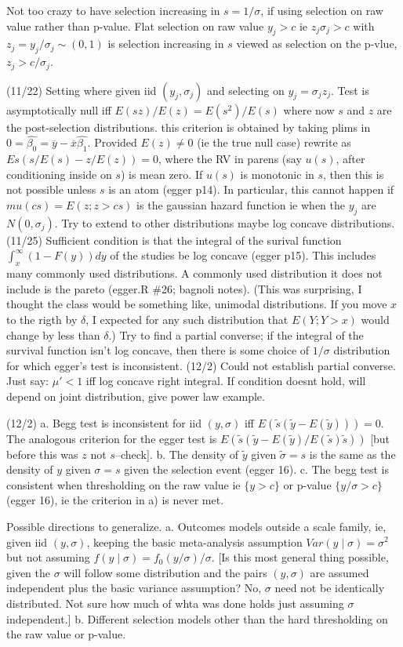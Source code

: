 \documentclass{article}
\renewcommand{\t}[1]{\tilde{#1}}
\begin{document}
Not too crazy to have selection increasing in $s=1/\sigma$, if using
selection on raw value rather than p-value. Flat selection on raw
value $y_j>c$ ie $z_j\sigma_j>c$ with $z_j=y_j/\sigma_j\sim (0,1)$ is
selection increasing in $s$ viewed as selection on the p-vlue,
$z_j>c/\sigma_j$.

(11/22) Setting where given iid $(y_j,\sigma_j)$ and selecting on
$y_j=\sigma_jz_j$. Test is asymptotically null iff
$E(sz)/E(z)=E(s^2)/E(s)$ where now $s$ and $z$ are the post-selection
distributions. this criterion is obtained by taking plims in
$0=\hat{\beta_0}=\overline{y}-\overline{x}\hat{\beta_1}$. Provided
$E(z)\neq 0$ (ie the true null case) rewrite as $Es(s/E(s)-z/E(z))=0$,
where the RV in parens (say $u(s)$, after conditioning inside on $s$)
is mean zero. If $u(s)$ is monotonic in $s$, then this is not possible
unless $s$ is an atom (egger p14). In particular, this cannot happen
if $mu(cs)=E(z;z>cs)$ is the gaussian hazard function ie when the
$y_j$ are $N(0,\sigma_j)$. Try to extend to other distributions maybe
log concave distributions. (11/25) Sufficient condition is that the
integral of the surival function $\int_x^{\infty}(1-F(y))dy$ of the
studies be log concave (egger p15). This includes many commonly used
distributions. A commonly used distribution it does not include is the
pareto (egger.R \#26; bagnoli notes). (This was surprising, I thought the class
would be something like, unimodal distributions. If you move $x$ to
the rigth by $\delta$, I expected for any such distribution that
$E(Y;Y>x)$ would change by less than $\delta$.) Try to find a partial
converse; if the integral of the survival function isn't log concave,
then there is some choice of $1/\sigma$ distribution for which egger's
test is inconsistent. (12/2) Could  not establish partial converse. Just say:  $\mu'<1$ iff log concave right integral. If condition doesnt hold, will depend on joint distribution, give power law example. 

(12/2) a. Begg test is inconsistent for iid $(y,\sigma)$ iff
$E(\t{s}(\t{y}-E(\t{y})))=0$. The analogous criterion for the egger
test is $E(\t{s}(\t{y}-E(\t{y})/E(\t{s})\t{s}))$ [but before this was
$z$ not $s$--check].  b. The density of $\tilde{y}$ given
$\t{\sigma}=s$ is the same as the density of $y$ given $\sigma=s$
given the selection event (egger 16). c. The begg test is consistent
when thresholding on the raw value ie $\{y>c\}$ or p-value
$\{y/\sigma>c\}$ (egger 16), ie the criterion in a) is never met.

Possible directions to generalize. a. Outcomes models outside a scale
family, ie, given iid $(y,\sigma)$, keeping the basic meta-analysis
assumption $Var(y\mid\sigma)=\sigma^2$ but not assuming
$f(y\mid\sigma)=f_0(y/\sigma)/\sigma$. [Is this most general thing
possible, given the $\sigma$ will follow some distribution and the
pairs $(y,\sigma)$ are assumed independent plus the basic variance
assumption? No, $\sigma$ need not be identically distributed. Not sure
how much of whta was done holds just assuming $\sigma$ independent.]
b. Different selection models other than the hard thresholding on the
raw value or p-value.
\end{document}
